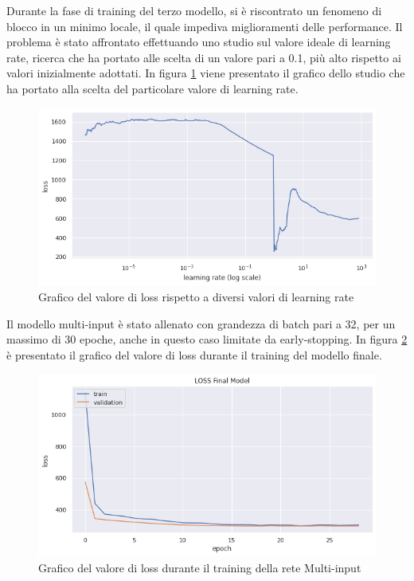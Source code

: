     Durante la fase di training del terzo modello, si è riscontrato un fenomeno di blocco in un minimo locale, il quale impediva miglioramenti delle performance. Il problema
    è stato affrontato effettuando uno studio sul valore ideale di learning rate, ricerca che ha portato alle scelta di un valore pari a 0.1, più alto rispetto ai valori inizialmente
    adottati. In figura \ref{fig:learning_rate} viene presentato il grafico dello studio che ha portato alla scelta del particolare valore di learning rate.
        \begin{figure}[H]
            \centering
            \includegraphics[scale=0.5]{Plot/learning-rate.png}
            \caption{Grafico del valore di loss rispetto a diversi valori di learning rate}
            \label{fig:learning_rate}
        \end{figure}

    Il modello multi-input è stato allenato con grandezza di batch pari a 32, per un massimo di 30 epoche, anche in questo caso limitate da early-stopping. In figura \ref{fig:loss_mulinput} è
    presentato il grafico del valore di loss durante il training del modello finale.
        \begin{figure}[h!]
            \centering
            \includegraphics[scale=0.5]{Plot/loss-final.png}
            \caption{Grafico del valore di loss durante il training della rete Multi-input}
            \label{fig:loss_mulinput}
        \end{figure}




